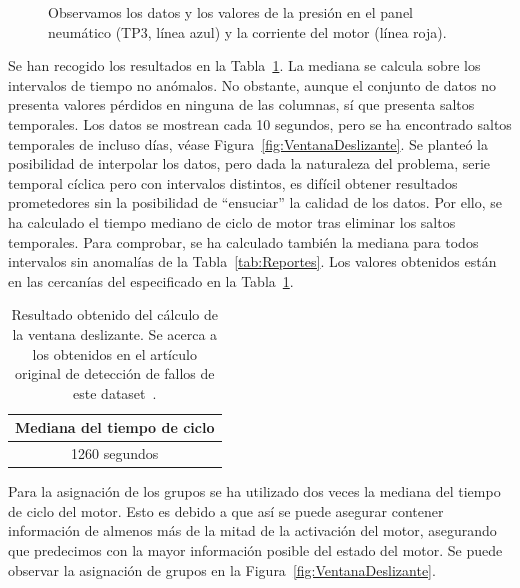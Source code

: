 \documentclass[12pt,letterpaper]{article}
\begin{document}
\begin{figure}[!ht]
        \centering
        \caption{Observamos los datos y los valores de la presión en el panel neumático (TP3, línea azul) y la corriente del motor (línea roja).}
        \label{fig:VisualizacionDatos}
\end{figure}

Se han recogido los resultados en la Tabla~\ref{tab:TiempoCiclo}. La mediana se calcula sobre los intervalos de tiempo no anómalos. No obstante, 
aunque el conjunto de datos no presenta valores pérdidos en ninguna de las columnas, sí que presenta saltos temporales. Los datos se mostrean cada 10 segundos, 
pero se ha encontrado saltos temporales de incluso días, véase Figura~\ref{fig:VentanaDeslizante}. Se planteó la posibilidad de interpolar los datos, pero dada la naturaleza 
del problema, serie temporal cíclica pero con intervalos distintos, es difícil obtener resultados prometedores sin la posibilidad de ``ensuciar'' la calidad de los datos.
Por ello, se ha calculado el tiempo mediano de ciclo de motor tras eliminar los saltos temporales. Para comprobar, se ha calculado también la mediana 
para todos intervalos sin anomalías de la Tabla~\ref{tab:Reportes}. Los valores obtenidos están en las cercanías del especificado en la Tabla~\ref{tab:TiempoCiclo}.

\begin{table}[!ht]
    \centering
    \begin{tabular}{|c|}
    \hline
    \textbf{Mediana del tiempo de ciclo} \\ \hline 
    1260 segundos\\
    \hline
    \end{tabular}
    \caption{Resultado obtenido del cálculo de la ventana deslizante. Se acerca a los obtenidos en el artículo original de detección de fallos de este dataset~\cite{FailureDetection}.}
    \label{tab:TiempoCiclo}
\end{table}

Para la asignación de los grupos se ha utilizado dos veces la mediana del tiempo de ciclo del motor. 
Esto es debido a que así se puede asegurar contener información de almenos más de la mitad de la activación del motor, asegurando que predecimos con la mayor información posible del estado del motor.
Se puede observar la asignación de grupos en la Figura~\ref{fig:VentanaDeslizante}.
\end{document}
